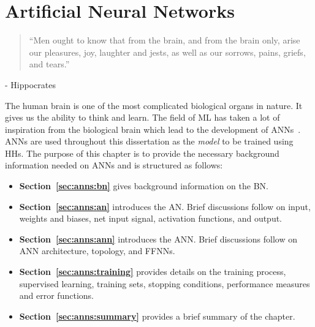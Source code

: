 \chapter{Artificial Neural Networks}
\label{chap:anns}

\begin{quotation}
      ``Men ought to know that from the brain, and from the brain only, arise our pleasures, joy, laughter and jests, as well as our sorrows, pains, griefs, and tears.''
\end{quotation}
\begin{flushright}
      - Hippocrates
\end{flushright}

The human brain is one of the most complicated biological organs in nature. It gives us the ability to think and learn. The field of \acs{ML} has taken a lot of inspiration from the biological brain which lead to the development of \acp{ANN}~\cite{ref:rosenblatt:1958}. \acp{ANN} are used throughout this dissertation as the \textit{model} to be trained using \acp{HH}. The purpose of this chapter is to provide the necessary background information needed on \acp{ANN} and is structured as follows:

\begin{itemize}
      \item \textbf{Section~\ref{sec:anns:bn}} gives background information on the \acs{BN}.

      \item \textbf{Section~\ref{sec:anns:an}} introduces the \acs{AN}. Brief discussions follow on input, weights and biases, net input signal, activation functions, and output.

      \item \textbf{Section~\ref{sec:anns:ann}} introduces the \acs{ANN}. Brief discussions follow on \acs{ANN} architecture, topology, and \acp{FFNN}.

      \item \textbf{Section~\ref{sec:anns:training}} provides details on the training process, supervised learning, training sets, stopping conditions, performance measures and error functions.

      \item \textbf{Section~\ref{sec:anns:summary}} provides a brief summary of the chapter.
\end{itemize}


